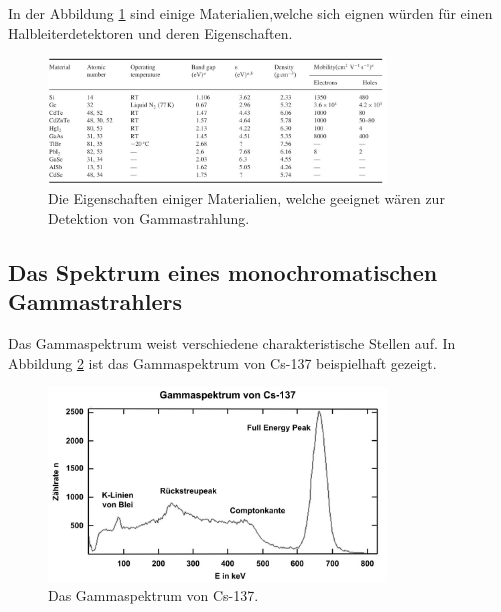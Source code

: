 In der Abbildung \ref{fig:halbleitermatrialien} sind einige Materialien,welche sich eignen würden für einen Halbleiterdetektoren und deren Eigenschaften.

\begin{figure}[H]
    \centering
    \includegraphics[width=0.8\textwidth]{content/grafik/passende.jpg}
    \caption{Die Eigenschaften einiger Materialien, welche geeignet wären zur Detektion von Gammastrahlung.\cite{gamma_ray}}
    \label{fig:halbleitermatrialien}
\end{figure}

\subsection{Das Spektrum eines monochromatischen Gammastrahlers}
\label{sec:Gammastrahlung}

Das Gammaspektrum weist verschiedene charakteristische Stellen auf. In Abbildung \ref{fig:gamma-cs} ist das Gammaspektrum von
Cs-137 beispielhaft gezeigt.

\begin{figure}[H]
    \centering
    \includegraphics[width=0.8\textwidth]{content/grafik/Gammaspektrum.jpg}
    \caption{Das Gammaspektrum von Cs-137. \cite{Gammaspektrum}}
    \label{fig:gamma-cs}
\end{figure}

